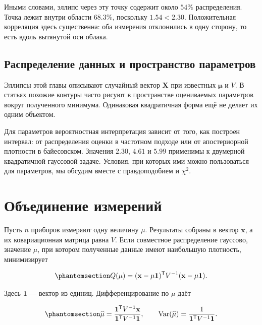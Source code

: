 \documentclass[
  russian,
  11pt,
  a4paper,
  open=any]{scrbook}
\begin{document}
Иными словами, эллипс через эту точку содержит около \(54\%\)
распределения. Точка лежит внутри области \(68.3\%\), поскольку
\(1.54<2.30\). Положительная корреляция здесь существенна: оба измерения
отклонились в одну сторону, то есть вдоль вытянутой оси облака.

\subsection{Распределение данных и пространство
параметров}\label{ux440ux430ux441ux43fux440ux435ux434ux435ux43bux435ux43dux438ux435-ux434ux430ux43dux43dux44bux445-ux438-ux43fux440ux43eux441ux442ux440ux430ux43dux441ux442ux432ux43e-ux43fux430ux440ux430ux43cux435ux442ux440ux43eux432}

Эллипсы этой главы описывают случайный вектор \(\mathbf X\) при
известных \(\boldsymbol\mu\) и \(V\). В статьях похожие контуры часто
рисуют в пространстве оцениваемых параметров вокруг полученного
минимума. Одинаковая квадратичная форма ещё не делает их одним объектом.

Для параметров вероятностная интерпретация зависит от того, как построен
интервал: от распределения оценки в частотном подходе или от
апостериорной плотности в байесовском. Значения \(2.30\), \(4.61\) и
\(5.99\) применимы к двумерной квадратичной гауссовой задаче. Условия,
при которых ими можно пользоваться для параметров, мы обсудим вместе с
правдоподобием и \(\chi^2\).

\section{Объединение
измерений}\label{ux43eux431ux44aux435ux434ux438ux43dux435ux43dux438ux435-ux438ux437ux43cux435ux440ux435ux43dux438ux439}

Пусть \(n\) приборов измеряют одну величину \(\mu\). Результаты собраны
в вектор \(\mathbf x\), а их ковариационная матрица равна \(V\). Если
совместное распределение гауссово, значение \(\mu\), при котором
полученные данные имеют наибольшую плотность, минимизирует

\begin{equation}\protect\phantomsection\label{eq-ch7-combination-quadratic-form}{
Q(\mu)=
(\mathbf x-\mu\mathbf1)^{\mathsf T}
V^{-1}
(\mathbf x-\mu\mathbf1).
}\end{equation}

Здесь \(\mathbf1\) --- вектор из единиц. Дифференцирование по \(\mu\)
даёт

\begin{equation}\protect\phantomsection\label{eq-ch7-correlated-weighted-mean}{
\widehat\mu=
\frac{\mathbf1^{\mathsf T}V^{-1}\mathbf x}
{\mathbf1^{\mathsf T}V^{-1}\mathbf1},
\qquad
\operatorname{Var}(\widehat\mu)=
\frac{1}{\mathbf1^{\mathsf T}V^{-1}\mathbf1}.
}\end{equation}
\end{document}
